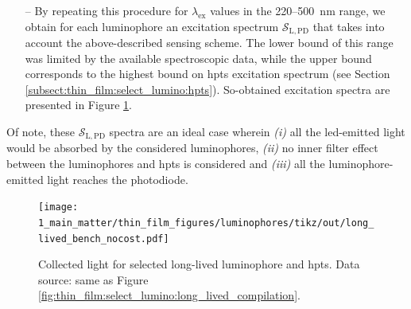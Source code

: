 \begin{itemize}
\begin{equation}
	\end{equation}
	\item[--] By repeating this procedure for $\lambda_\mathrm{ex}$ values in the 220--500~nm range, we obtain for each luminophore an excitation spectrum $\mathcal{S}_\mathrm{L,PD}$ that takes into account the above-described sensing scheme. The lower bound of this range was limited by the available spectroscopic data, while the upper bound corresponds to the highest bound on \gls{hpts} excitation spectrum (see Section \ref{subsect:thin_film:select_lumino:hpts}). So-obtained excitation spectra are presented in Figure \ref{fig:thin_film:select_lumino:long_lived_bench_nocost}.
\end{itemize}
Of note, these $\mathcal{S}_\mathrm{L,PD}$ spectra are an ideal case wherein \textit{(i)} all the \gls{led}-emitted light would be absorbed by the considered luminophores, \textit{(ii)} no inner filter effect between the luminophores and \gls{hpts} is considered and \textit{(iii)} all the luminophore-emitted light reaches the photodiode. %

\begin{figure}
	\centering
	\texttt{[image: 1\_main\_matter/thin\_film\_figures/luminophores/tikz/out/long\_lived\_bench\_nocost.pdf]}
	\caption[Collected light for selected long-lived luminophore and \gls{hpts}.]{Collected light for selected long-lived luminophore and \gls{hpts}. Data source: same as Figure \ref{fig:thin_film:select_lumino:long_lived_compilation}.}
	\label{fig:thin_film:select_lumino:long_lived_bench_nocost}
\end{figure}

